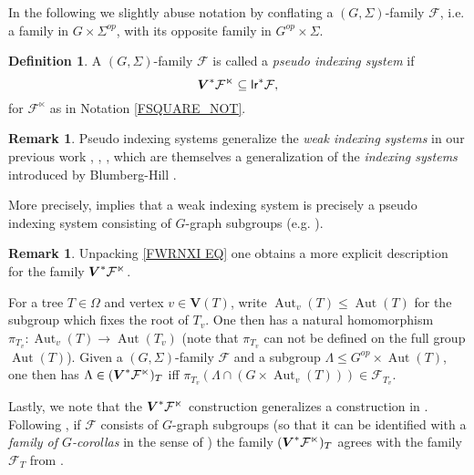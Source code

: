 \documentclass[a4paper,10pt
,draft
]{article}%
\numberwithin{equation}{section}
\numberwithin{figure}{section}
\theoremstyle{definition} %
\newtheorem{definition}[equation]{Definition}%
\newtheorem{remark}[equation]{Remark}%
\DeclareMathOperator{\Aut}{Aut}%
\newcommand{\F}{\ensuremath{\mathcal F}}
\newcommand{\1}{\ensuremath{\mathbbm 1}}%
\begin{document}
In the following 
we slightly abuse notation by conflating
a $(G,\Sigma)$-family $\F$,
i.e. a family in $G \times \Sigma^{op}$,
with its opposite family
in $G^{op} \times \Sigma$.


\begin{definition}\label{PIS_DEF}
	A $(G,\Sigma)$-family $\F$ is called a \textit{pseudo indexing system} if
\begin{equation}\label{PIS_EQ}
	\boldsymbol{V}^{\**} \F^\ltimes \subseteq \mathsf{lr}^{\**}\F,
\end{equation}
for $\F^\ltimes$ as in Notation \ref{FSQUARE_NOT}.
\end{definition}



\begin{remark}
	Pseudo indexing systems generalize the
	\textit{weak indexing systems} in our previous work
	\cite[Defn. 9.5]{Per18}, \cite[Defn. 4.49]{BP_geo}, \cite[Defn. 6.2]{BP_edss},
	which are themselves a generalization of the 
	\textit{indexing systems} introduced by Blumberg-Hill \cite[Defn. 3.22]{BH15}.
	
	More precisely, \cite[Remark 6.45]{BP_geo} implies that
        a weak indexing system is precisely a pseudo indexing system consisting of $G$-graph subgroups (e.g. \cite[Defn. 6.34]{BP_geo}).
\end{remark}



\begin{remark}
	Unpacking \eqref{FWRNXI EQ} one obtains a more 
	explicit description for the family
	$\boldsymbol{V}^{\**}\F^\ltimes$.

	For a tree $T \in \Omega$
	and vertex $v \in \boldsymbol{V}(T)$, write 
	$\Aut_{v}(T) \leq \Aut(T)$ for the subgroup which fixes the root of $T_v$.
	One then has a natural homomorphism
	$\pi_{T_v} \colon \Aut_v(T) \to \Aut(T_v)$
	(note that $\pi_{T_v}$ can not be defined on the full group
	$\Aut(T)$).
%
	Given a $(G,\Sigma)$-family $\F$ and a subgroup $\Lambda \leq G^{op} \times \Aut(T)$,
	one then has
	$\Lambda \in (\boldsymbol{V}^{\**}\F^\ltimes)_T$ iff
	$\pi_{T_v}\left( \Lambda \cap (G \times \Aut_{v}(T)) \right) \in \F_{T_v}$.

	Lastly, we note that the $\boldsymbol{V}^{\**}\F^\ltimes$
	construction generalizes a construction in
	\cite{BP_geo}.
	Following \cite[Rem. 6.46]{BP_geo}, 
	if $\F$ consists of $G$-graph subgroups
	(so that it can be identified with a 
	\textit{family of $G$-corollas} in the sense of \cite[Defn. 4.44]{BP_geo})
	the family $(\boldsymbol{V}^{\**}\F^\ltimes)_T$ agrees
	with the family $\F_T$ from \cite[Prop. 6.44]{BP_geo}.
\end{remark}
\end{document}
